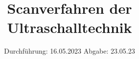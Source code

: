 

%

\subject{US1}
\title{Scanverfahren der Ultraschalltechnik}
\date{%
  Durchführung: 16.05.2023
  \hspace{3em}
  Abgabe: 23.05.23
}


\setlength{\parindent}{0pt} %

\maketitle
\thispagestyle{empty}
\tableofcontents
\newpage







\printbibliography{}




